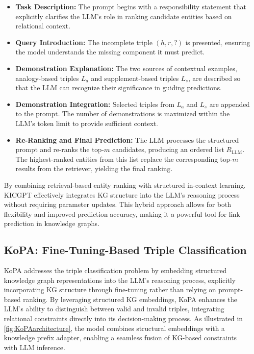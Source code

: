 \documentclass[12pt,a4paper]{article}
\begin{document}
\begin{itemize}
    \item \textbf{Task Description:} The prompt begins with a responsibility statement that explicitly clarifies the LLM’s role in ranking candidate entities based on relational context.
    \item \textbf{Query Introduction:} The incomplete triple \( (h, r, ?) \) is presented, ensuring the model understands the missing component it must predict.
    \item \textbf{Demonstration Explanation:} The two sources of contextual examples, analogy-based triples \( L_a \) and supplement-based triples \( L_s \), are described so that the LLM can recognize their significance in guiding predictions.
    \item \textbf{Demonstration Integration:} Selected triples from \( L_a \) and \( L_s \) are appended to the prompt. The number of demonstrations is maximized within the LLM’s token limit to provide sufficient context.
    \item \textbf{Re-Ranking and Final Prediction:} The LLM processes the structured prompt and re-ranks the top-\( m \) candidates, producing an ordered list \( R_{\text{LLM}} \). The highest-ranked entities from this list replace the corresponding top-\( m \) results from the retriever, yielding the final ranking.
\end{itemize}

By combining retrieval-based entity ranking with structured in-context learning, KICGPT effectively integrates KG structure into the LLM’s reasoning process without requiring parameter updates. This hybrid approach allows for both flexibility and improved prediction accuracy, making it a powerful tool for link prediction in knowledge graphs.

\subsection{KoPA: Fine-Tuning-Based Triple Classification}

KoPA addresses the triple classification problem by embedding structured knowledge graph representations into the LLM’s reasoning process, explicitly incorporating KG structure through fine-tuning rather than relying on prompt-based ranking.
By leveraging structured KG embeddings, KoPA enhances the LLM’s ability to distinguish between valid and invalid triples, integrating relational constraints directly into its decision-making process.
As illustrated in \cref{fig:KoPAarchitecture}, the model combines structural embeddings with a knowledge prefix adapter, enabling a seamless fusion of KG-based constraints with LLM inference.
\end{document}
